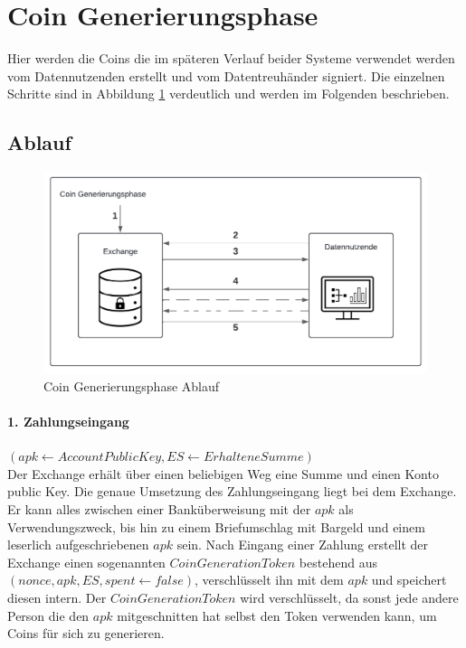 \documentclass{scrreprt}
\begin{document}
\section{Coin Generierungsphase}
\label{system:coingeneration}
Hier werden die Coins die im späteren Verlauf beider Systeme verwendet werden vom Datennutzenden erstellt und vom Datentreuhänder signiert. Die einzelnen Schritte sind in Abbildung \ref{fig:coin-generationphase} verdeutlich und werden im Folgenden beschrieben.
\subsection{Ablauf}
\begin{figure}[H]
    \centering
    \includegraphics[width=0.9\linewidth]{CoinGenerationPhaseDiagramm.pdf}
    \caption{Coin Generierungsphase Ablauf}
    \label{fig:coin-generationphase}
\end{figure}

\paragraph{1. Zahlungseingang} $(apk \leftarrow AccountPublicKey, ES \leftarrow ErhalteneSumme)$\\
Der Exchange erhält über einen beliebigen Weg eine Summe und einen Konto public Key. Die genaue Umsetzung des Zahlungseingang liegt bei dem Exchange. Er kann alles zwischen einer Banküberweisung mit der $apk$ als Verwendungszweck, bis hin zu einem Briefumschlag mit Bargeld und einem leserlich aufgeschriebenen $apk$ sein. Nach Eingang einer Zahlung erstellt der Exchange einen sogenannten $CoinGenerationToken$ bestehend aus $(nonce, apk, ES, spent \leftarrow false)$, verschlüsselt ihn mit dem $apk$ und speichert diesen intern. Der $CoinGenerationToken$ wird verschlüsselt, da sonst jede andere Person die den $apk$ mitgeschnitten hat selbst den Token verwenden kann, um Coins für sich zu generieren.
\end{document}
